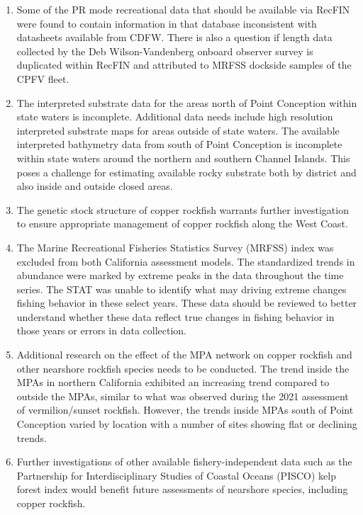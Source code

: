 \documentclass[11pt,
  letterpaper,
]{article}
\begin{document}
\begin{enumerate}
    \item Some of the PR mode recreational data that should be available via RecFIN were found to contain information in that database inconsistent with datasheets available from CDFW. There is also a question if length data collected by the Deb Wilson-Vandenberg onboard observer survey is duplicated within RecFIN and attributed to MRFSS dockside samples of the CPFV fleet.

    \item The interpreted substrate data for the areas north of Point Conception within state waters is incomplete. Additional data needs include high resolution interpreted substrate maps for areas outside of state waters. The available interpreted bathymetry data from south of Point Conception is incomplete within state waters  around the northern and southern Channel Islands. This poses a challenge for estimating available rocky substrate both by district and also inside and outside closed areas. 

    \item The genetic stock structure of copper rockfish warrants further investigation to ensure appropriate management of copper rockfish along the West Coast. 

    \item The Marine Recreational Fisheries Statistics Survey (MRFSS) index was excluded from both California assessment models. The standardized trends in abundance were marked by extreme peaks in the data throughout the time series. The STAT was unable to identify what may driving extreme changes fishing behavior in these select years. These data should be reviewed to better understand whether these data reflect true changes in fishing behavior in those years or errors in data collection. 

    \item Additional research on the effect of the MPA network on copper rockfish and other nearshore rockfish species needs to be conducted. The trend inside the MPAs in northern California exhibited an increasing trend compared to outside the MPAs, similar to what was observed during the 2021 assessment of vermilion/sunset rockfish. However, the trends inside MPAs south of Point Conception varied by location with a number of sites showing flat or declining trends.  

    \item Further investigations of other available fishery-independent data such as the Partnership for Interdisciplinary Studies of Coastal Oceans (PISCO) kelp forest index would benefit future assessments of nearshore species, including copper rockfish. 


\end{enumerate}
\end{document}
